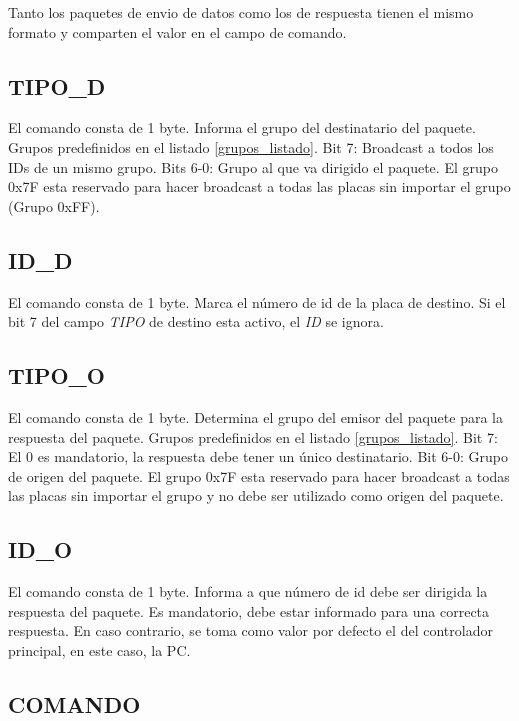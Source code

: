 \documentclass[a4paper,11pt]{article}
\begin{document}
Tanto los paquetes de envio de datos como los de respuesta tienen el mismo formato y comparten el valor en el campo de comando.

\subsection{TIPO\_D}
\label{tipo_destinatario}

	El comando consta de 1 byte.
	Informa el grupo del destinatario del paquete.
	Grupos predefinidos en el listado \ref{grupos_listado}.
	Bit 7: Broadcast a todos los IDs de un mismo grupo.
	Bits 6-0: Grupo al que va dirigido el paquete. El grupo 0x7F esta reservado para hacer broadcast a todas las placas sin importar el grupo (Grupo 0xFF).

\subsection{ID\_D}
\label{id_destinatario}

	El comando consta de 1 byte.
	Marca el n\'umero de id de la placa de destino.
	Si el bit 7 del campo \emph{TIPO} de destino esta activo, el \emph{ID} se ignora.

\subsection{TIPO\_O}
\label{tipo_emisor}

	El comando consta de 1 byte.
	Determina el grupo del emisor del paquete para la respuesta del paquete.
	Grupos predefinidos en el listado \ref{grupos_listado}.
	Bit 7: El 0 es mandatorio, la respuesta debe tener un \'unico destinatario.
	Bit 6-0: Grupo de origen del paquete.
	El grupo 0x7F esta reservado para hacer broadcast a todas las placas sin importar el grupo y no debe ser utilizado como origen del paquete.

\subsection{ID\_O}
\label{id_emisor}

	El comando consta de 1 byte.
	Informa a que n\'umero de id debe ser dirigida la respuesta del paquete.
	Es mandatorio, debe estar informado para una correcta respuesta.
	En caso contrario, se toma como valor por defecto el del controlador principal, en este caso, la PC.
		
\subsection{COMANDO}
\label{comando}
\end{document}
